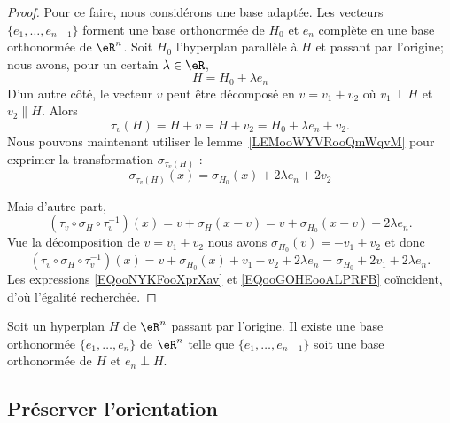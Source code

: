 \begin{proof}
	Pour ce faire, nous considérons une base adaptée. Les vecteurs \( \{ e_1,\ldots, e_{n-1} \}\) forment une base orthonormée de \( H_0\) et \( e_n\) complète en une base orthonormée de \( \eR^n\). Soit \( H_0\) l'hyperplan parallèle à \( H\) et passant par l'origine; nous avons, pour un certain \( \lambda\in \eR\),
	\begin{equation}
		H=H_0+\lambda e_n
	\end{equation}
	D'un autre côté, le vecteur \( v\) peut être décomposé en \( v=v_1+v_2\) où \( v_1\perp H\) et \( v_2\parallel H\). Alors
	\begin{equation}
		\tau_v(H)=H+v=H+v_2=H_0+\lambda e_n+v_2.
	\end{equation}
	Nous pouvons maintenant utiliser le lemme~\ref{LEMooWYVRooQmWqvM} pour exprimer la transformation \( \sigma_{\tau_v(H)}\) :
	\begin{equation}        \label{EQooNYKFooXprXav}
		\sigma_{\tau_v(H)}(x)=\sigma_{H_0}(x)+ 2\lambda e_n+2v_2
	\end{equation}

	Mais d'autre part,
	\begin{equation}
		(\tau_v\circ \sigma_H\circ\tau_{v}^{-1})(x)=v+\sigma_H(x-v)=v+\sigma_{H_0}(x-v)+2\lambda e_n.
	\end{equation}
	Vue la décomposition de \( v=v_1+v_2\) nous avons \( \sigma_{H_0}(v)=-v_1+v_2\) et donc
	\begin{equation}        \label{EQooGOHEooALPRFB}
		(\tau_v\circ \sigma_H\circ\tau_{v}^{-1})(x)= v+  \sigma_{H_0}(x)+v_1-v_2+2\lambda e_n=\sigma_{H_0}+2v_1+2\lambda e_n.
	\end{equation}
	Les expressions \eqref{EQooNYKFooXprXav} et \eqref{EQooGOHEooALPRFB} coïncident, d'où l'égalité recherchée.
\end{proof}

\begin{proposition}     \label{PROPooLYCUooRQgGtF}
    Soit un hyperplan \( H\) de \( \eR^n\) passant par l'origine. Il existe une base orthonormée \( \{ e_1,\ldots, e_n \}\) de \( \eR^n\) telle que \( \{ e_1,\ldots, e_{n-1} \}\) soit une base orthonormée de \( H\) et \( e_n\perp H\).
\end{proposition}

\subsection{Préserver l'orientation}


